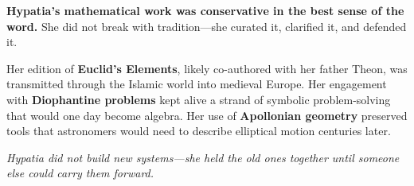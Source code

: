 \begin{tcolorbox}[
  colback=gray!5,
  colframe=black,
  title=\textbf{Historical Sidebar: Hypatia and the Preservation of Structure},
  fonttitle=\bfseries,
  width=\linewidth,
  boxrule=0.4pt,
  arc=2mm,
  left=4pt,
  right=4pt,
  top=6pt,
  bottom=6pt
]

\textbf{Hypatia’s mathematical work was conservative in the best sense of the word.} She did not break with tradition—she curated it, clarified it, and defended it.

\medskip

Her edition of \textbf{Euclid’s Elements}, likely co-authored with her father Theon, was transmitted through the Islamic world into medieval Europe. Her engagement with \textbf{Diophantine problems} kept alive a strand of symbolic problem-solving that would one day become algebra. Her use of \textbf{Apollonian geometry} preserved tools that astronomers would need to describe elliptical motion centuries later.

\medskip

\textit{Hypatia did not build new systems—she held the old ones together until someone else could carry them forward.}

\end{tcolorbox}
